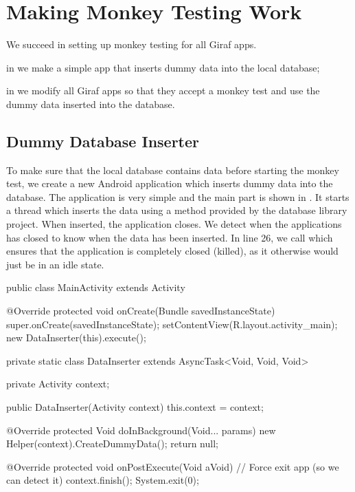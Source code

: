 \chapter{Making Monkey Testing Work}
We succeed in setting up monkey testing for all Giraf apps.

\begin{chapterorganization}
  \item in  we make a simple app that inserts dummy data into the local database;
  \item in  we modify all Giraf apps so that they accept a monkey test and use the dummy data inserted into the database.
\end{chapterorganization}

\section{Dummy Database Inserter}\label{sec:dummy_db_inserter}
To make sure that the local database contains data before starting the monkey test, we create a new Android application which inserts dummy data into the database. The application is very simple and the main part is shown in . It starts a thread which inserts the data using a method provided by the database library project. When inserted, the application closes. We detect when the applications has closed to know when the data has been inserted. In line 26, we call  which ensures that the application is completely closed (killed), as it otherwise would just be in an idle state.

\begin{javacode}[caption=Dummy database inserter \mono{MainActivity},label=lst:dummy_db_ins_main_activity]
public class MainActivity extends Activity {
    @Override
    protected void onCreate(Bundle savedInstanceState) {
        super.onCreate(savedInstanceState);
        setContentView(R.layout.activity_main);
        new DataInserter(this).execute();
    }

    private static class DataInserter extends AsyncTask<Void, Void, Void> {
        private Activity context;

        public DataInserter(Activity context) {
            this.context = context;
        }

        @Override
        protected Void doInBackground(Void... params) {
            new Helper(context).CreateDummyData();
            return null;
        }

        @Override
        protected void onPostExecute(Void aVoid) {
            // Force exit app (so we can detect it)
            context.finish();
            System.exit(0);
        }
    }
}
\end{javacode}

